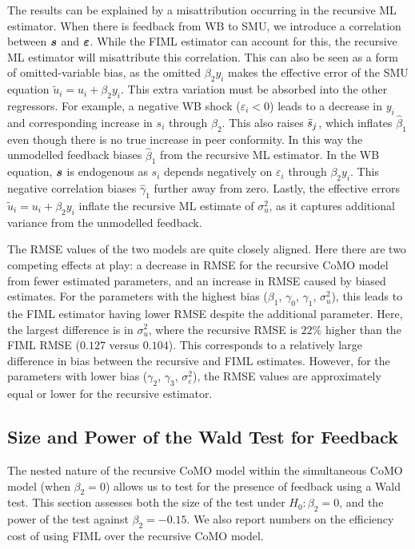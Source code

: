 The results can be explained by a misattribution occurring in the recursive ML estimator. When there is feedback from WB to SMU, we introduce a correlation between $\bm{s}$ and $\bm{\varepsilon}$. While the FIML estimator can account for this, the recursive ML estimator will misattribute this correlation. This can also be seen as a form of omitted-variable bias, as the omitted $\beta_2 y_i$ makes the effective error of the SMU equation $\tilde{u}_i = u_i + \beta_2 y_i$. This extra variation must be absorbed into the other regressors. For example, a negative WB shock ($\varepsilon_i < 0$) leads to a decrease in $y_i$ and corresponding increase in $s_i$ through $\beta_2$. This also raises $\bar{s}_j$, which inflates $\hat{\beta}_1$ even though there is no true increase in peer conformity. In this way the unmodelled feedback biases $\hat{\beta}_1$ from the recursive ML estimator. In the WB equation, $\bm{s}$ is endogenous as $s_i$ depends negatively on $\varepsilon_i$ through $\beta_2 y_i$. This negative correlation biases $\hat{\gamma}_1$ further away from zero. Lastly, the effective errors $\tilde{u}_i = u_i + \beta_2 y_i$ inflate the recursive ML estimate of $\sigma_u^2$, as it captures additional variance from the unmodelled feedback.

The RMSE values of the two models are quite closely aligned. Here there are two competing effects at play: a decrease in RMSE for the recursive CoMO model from fewer estimated parameters, and an increase in RMSE caused by biased estimates. For the parameters with the highest bias ($\beta_1$, $\gamma_0$, $\gamma_1$, $\sigma_u^2$), this leads to the FIML estimator having lower RMSE despite the additional parameter. Here, the largest difference is in $\sigma_u^2$, where the recursive RMSE is $22\%$ higher than the FIML RMSE ($0.127$ versus $0.104$). This corresponds to a relatively large difference in bias between the recursive and FIML estimates. However, for the parameters with lower bias ($\gamma_2$, $\gamma_3$, $\sigma_\varepsilon^2$), the RMSE values are approximately equal or lower for the recursive estimator.

\subsection{Size and Power of the Wald Test for Feedback}
\label{sec:simul:wald_test}
The nested nature of the recursive CoMO model within the simultaneous CoMO model (when $\beta_2 = 0$) allows us to test for the presence of feedback using a Wald test. This section assesses both the size of the test under $H_0: \beta_2 = 0$, and the power of the test against $\beta_2 = -0.15$. We also report numbers on the efficiency cost of using FIML over the recursive CoMO model.

